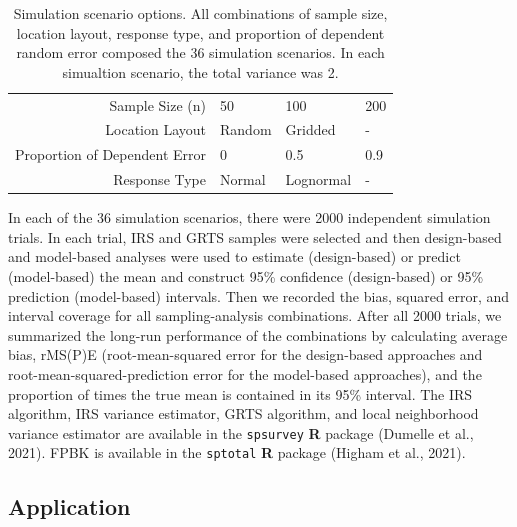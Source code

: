 \documentclass[]{elsarticle} %
\begin{document}
\begin{table}[ht]
\centering
\begin{tabular}{r|lll}
   \hline
Sample Size (n) & 50 & 100 & 200 \\ 
  Location Layout & Random & Gridded & - \\ 
  Proportion of Dependent Error & 0 & 0.5 & 0.9 \\ 
  Response Type & Normal & Lognormal & - \\ 
   \hline
\end{tabular}
\caption{\label{tab:parmtab} Simulation scenario options. All combinations of sample size, location layout, response type, and proportion of dependent random error composed the 36 simulation scenarios. In each simualtion scenario, the total variance was 2.} 
\end{table}

In each of the 36 simulation scenarios, there were 2000 independent
simulation trials. In each trial, IRS and GRTS samples were selected and
then design-based and model-based analyses were used to estimate
(design-based) or predict (model-based) the mean and construct 95\%
confidence (design-based) or 95\% prediction (model-based) intervals.
Then we recorded the bias, squared error, and interval coverage for all
sampling-analysis combinations. After all 2000 trials, we summarized the
long-run performance of the combinations by calculating average bias,
rMS(P)E (root-mean-squared error for the design-based approaches and
root-mean-squared-prediction error for the model-based approaches), and
the proportion of times the true mean is contained in its 95\% interval.
The IRS algorithm, IRS variance estimator, GRTS algorithm, and local
neighborhood variance estimator are available in the \texttt{spsurvey}
\textbf{\textsf{R}} package (Dumelle et al., 2021). FPBK is available in
the \texttt{sptotal} \textbf{\textsf{R}} package (Higham et al., 2021).

\hypertarget{sec:mm_app}{%
\subsection{Application}\label{sec:mm_app}}
\end{document}
